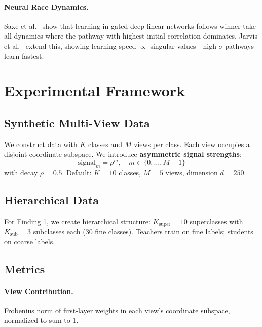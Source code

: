 \documentclass{article}
\begin{document}
\paragraph{Neural Race Dynamics.} Saxe et al.~\cite{saxe2022neural} show that learning in gated deep linear networks follows winner-take-all dynamics where the pathway with highest initial correlation dominates. Jarvis et al.~\cite{jarvis2025makehaste} extend this, showing learning speed $\propto$ singular values---high-$\sigma$ pathways learn fastest.

\section{Experimental Framework}
\label{sec:setup}

\subsection{Synthetic Multi-View Data}

We construct data with $K$ classes and $M$ views per class. Each view occupies a disjoint coordinate subspace. We introduce \textbf{asymmetric signal strengths}:
\begin{equation}
    \text{signal}_m = \rho^m, \quad m \in \{0, \ldots, M-1\}
\end{equation}
with decay $\rho = 0.5$. Default: $K=10$ classes, $M=5$ views, dimension $d=250$.

\subsection{Hierarchical Data}

For Finding 1, we create hierarchical structure: $K_{\text{super}}=10$ superclasses with $K_{\text{sub}}=3$ subclasses each (30 fine classes). Teachers train on fine labels; students on coarse labels.

\subsection{Metrics}

\paragraph{View Contribution.} Frobenius norm of first-layer weights in each view's coordinate subspace, normalized to sum to 1.
\end{document}
